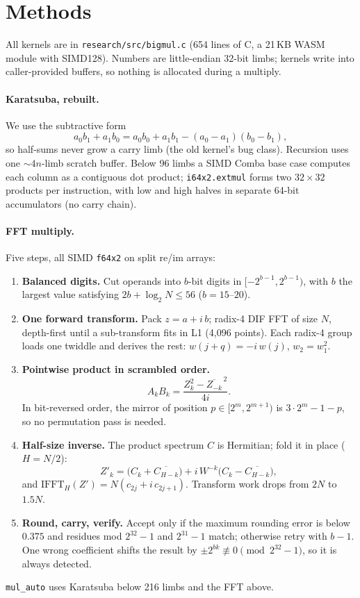 \documentclass[10pt,twocolumn]{article}
\begin{document}
\section{Methods}
All kernels are in \texttt{research/src/bigmul.c} (654 lines of C, a 21\,KB WASM module
with SIMD128). Numbers are little-endian 32-bit limbs; kernels write into caller-provided
buffers, so nothing is allocated during a multiply.

\paragraph{Karatsuba, rebuilt.} We use the subtractive form
\begin{equation}
a_0b_1 + a_1b_0 = a_0b_0 + a_1b_1 - (a_0-a_1)(b_0-b_1),
\end{equation}
so half-sums never grow a carry limb (the old kernel's bug class). Recursion uses one
$\sim4n$-limb scratch buffer. Below 96 limbs a SIMD Comba base case computes each column
as a contiguous dot product; \texttt{i64x2.extmul} forms two $32\times32$ products per
instruction, with low and high halves in separate 64-bit accumulators (no carry chain).

\paragraph{FFT multiply.} Five steps, all SIMD \texttt{f64x2} on split re/im arrays:
\begin{enumerate}
\item \textbf{Balanced digits.} Cut operands into $b$-bit digits in
  $[-2^{b-1}, 2^{b-1})$, with $b$ the largest value satisfying $2b + \log_2 N \le 56$
  ($b = 15$--$20$).
\item \textbf{One forward transform.} Pack $z = a + i\,b$; radix-4 DIF FFT of size $N$,
  depth-first until a sub-transform fits in L1 (4,096 points). Each radix-4 group loads one
  twiddle and derives the rest: $w(j+q) = -i\,w(j)$, $w_2 = w_1^2$.
\item \textbf{Pointwise product in scrambled order.}
  \begin{equation}
  A_kB_k = \frac{Z_k^2 - \overline{Z_{-k}}^{\,2}}{4i}.
  \end{equation}
  In bit-reversed order, the mirror of position $p \in [2^m, 2^{m+1})$ is
  $3\cdot2^m - 1 - p$, so no permutation pass is needed.
\item \textbf{Half-size inverse.} The product spectrum $C$ is Hermitian; fold it in place
  ($H = N/2$):
  \begin{equation}
  Z'_k = \bigl(C_k + \overline{C_{H-k}}\bigr) + i\,W^{-k}\bigl(C_k - \overline{C_{H-k}}\bigr),
  \end{equation}
  and $\mathrm{IFFT}_H(Z') = N(c_{2j} + i\,c_{2j+1})$. Transform work drops from $2N$ to $1.5N$.
\item \textbf{Round, carry, verify.} Accept only if the maximum rounding error is below
  $0.375$ and residues mod $2^{32}-1$ and $2^{31}-1$ match; otherwise retry with $b-1$.
  One wrong coefficient shifts the result by $\pm2^{bk} \not\equiv 0 \pmod{2^{32}-1}$, so it
  is always detected.
\end{enumerate}
\texttt{mul\_auto} uses Karatsuba below 216 limbs and the FFT above.
\end{document}
